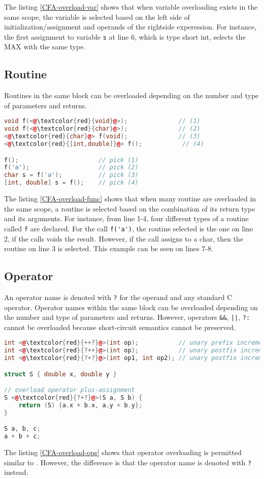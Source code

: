 The listing \ref{CFA-overload-var} shows that when variable overloading exists
in the same scope, the variable is selected based on the left side of
initialization/assignment and operands of the rightside experession. For
instance, the first assignment to variable \verb|s| at line 6, which is type short int,
selects the MAX with the same type.

\subsection{Routine}
Routines in the same block can be overloaded depending on the number and type of
parameters and returns.


\begin{lstlisting}[language=C++, caption={Overloading routines in \CFA},
label={CFA-overload-func}]
void f(<@\textcolor{red}{void}@>);              // (1)
void f(<@\textcolor{red}{char}@>);              // (2)
<@\textcolor{red}{char}@> f(void);              // (3)
<@\textcolor{red}{[int,double]}@> f();           // (4)

f();                      // pick (1)
f('a');                   // pick (2)
char s = f('a');          // pick (3)
[int, double] s = f();    // pick (4)
\end{lstlisting}

The listing \ref{CFA-overload-func} shows that when many routine are overloaded in
the same scope, a routine is selected based on the combination of its return type and its
arguments. For instance, from line 1-4, four different types of a routine called
\verb|f| are declared. For the call \verb|f('a')|, the routine selected is the
one on line 2, if the calls voids the result. However, if the call assigns to a
char, then the routine on line 3 is selected. This example can be seen on lines
7-8.

\subsection{Operator}
An operator name is denoted with \verb|?| for the operand and any standard C
operator. Operator names within the same block can be overloaded depending on
the number and type of parameters and returns. However, operators \verb|&&|,
\verb-||-, \verb|?:| cannot be overloaded because short-circuit semantics
cannot be preserved.


\begin{lstlisting}[language=C++, caption={Overloading operators in \CFA},
label={CFA-overload-ops}]
int <@\textcolor{red}{++?}@>(int op);           // unary prefix increment
int <@\textcolor{red}{?++}@>(int op);           // unary postfix increment
int <@\textcolor{red}{?+?}@>(int op1, int op2); // unary postfix increment

struct S { double x, double y }

// overload operator plus-assignment
S <@\textcolor{red}{?+?}@>(S a, S b) {
    return (S) {a.x + b.x, a.y + b.y};
}

S a, b, c;
a + b + c;
\end{lstlisting}

The listing \ref{CFA-overload-ops} shows that operator overloading is permitted
similar to \CC. However, the difference is that the operator name is
denoted with \verb|?| instead.
